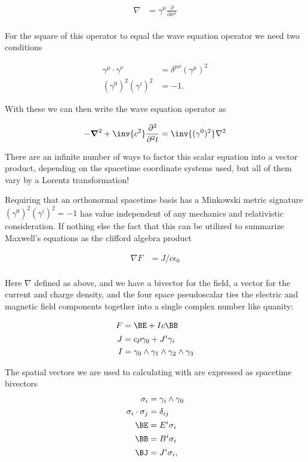 \documentclass{article}      %
\newcommand{\grad}[0]{\nabla}
\newcommand{\spacegrad}[0]{\boldsymbol{\nabla}}
\newcommand{\PD}[2]{\frac{\partial {#2}}{\partial {#1}}}
\newcommand{\PDsq}[2]{\frac{\partial^2 {#2}}{\partial^2 {#1}}}
\begin{document}
\begin{align*}
\grad &= \gamma^{\mu} \PD{x^{\mu}}{} \\
\end{align*}

For the square of this operator to equal the wave equation operator we need two conditions

\begin{align*}
\gamma^{\mu} \cdot \gamma^{\nu} &= \delta^{\mu\nu} {\left(\gamma^{\mu}\right)}^2 \\
(\gamma^0)^2 (\gamma^i)^2 &= -1.
\end{align*}

With these we can then write the wave equation operator as

\begin{align*}
-\spacegrad^2 + \inv{c^2}\PDsq{t}{} = \inv{(\gamma^0)^2} \grad^2
\end{align*}

There are an infinite number of ways to factor this scalar equation into a vector product, depending on the spacetime 
coordinate systems used, but all of them vary by a Lorentz transformation!

Requiring that an orthonormal spacetime basis has a Minkowski metric signature $(\gamma^0)^2 (\gamma^i)^2 = -1$ has value
independent of any mechanics and relativistic consideration.  If nothing else the fact that this can be utilized to
summarize Maxwell's equations as the clifford algebra product \cite{doran2003gap}

\begin{align*}
\grad F &= J/c \epsilon_0 \\
\end{align*}

Here $\grad$ defined as above, and we have a bivector for the field, a vector for the current and charge density, and the 
four space pseudoscalar ties the electric and magnetic field components together into a single complex number like quanity:

\begin{align*}
F &= \BE + I c \BB \\
J &= c \rho \gamma_0 + J^i \gamma_i \\
I &= \gamma_0 \wedge \gamma_1 \wedge \gamma_2 \wedge \gamma_3 \\
\end{align*}

The spatial vectors we are used to calculating with are expressed as spacetime bivectors
\begin{align*}
\sigma_i &= \gamma_i \wedge \gamma_0 \\
\sigma_i \cdot \sigma_j &= \delta_{ij} \\
\BE &= E^i \sigma_i \\
\BB &= B^i \sigma_i \\
\BJ &= J^i \sigma_i,
\end{align*}
\end{document}

